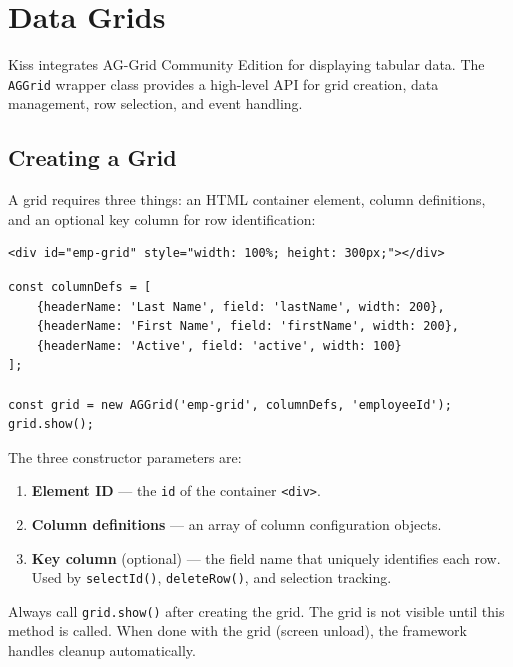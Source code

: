 \chapter{Data Grids}
\label{ch:grids}

Kiss integrates AG-Grid Community Edition for displaying tabular data.  The \texttt{AGGrid} wrapper class provides a high-level API for grid creation, data management, row selection, and event handling.

\section{Creating a Grid}
\label{sec:grid-create}

A grid requires three things: an HTML container element, column definitions, and an optional key column for row identification:

\begin{lstlisting}[style=html]
<div id="emp-grid" style="width: 100%; height: 300px;"></div>
\end{lstlisting}

\begin{lstlisting}[style=javascript]
const columnDefs = [
    {headerName: 'Last Name', field: 'lastName', width: 200},
    {headerName: 'First Name', field: 'firstName', width: 200},
    {headerName: 'Active', field: 'active', width: 100}
];

const grid = new AGGrid('emp-grid', columnDefs, 'employeeId');
grid.show();
\end{lstlisting}

\noindent
The three constructor parameters are:

\begin{enumerate}
  \item \textbf{Element ID} --- the \texttt{id} of the container \texttt{<div>}.
  \item \textbf{Column definitions} --- an array of column configuration objects.
  \item \textbf{Key column} (optional) --- the field name that uniquely identifies each row.  Used by \texttt{selectId()}, \texttt{deleteRow()}, and selection tracking.
\end{enumerate}

\begin{warnbox}
Always call \texttt{grid.show()} after creating the grid.  The grid is not visible until this method is called.  When done with the grid (screen unload), the framework handles cleanup automatically.
\end{warnbox}

